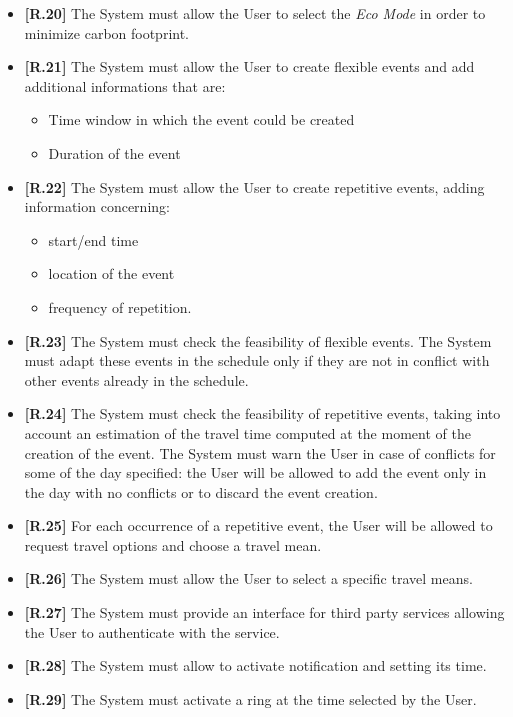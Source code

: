 \begin{itemize}
	\item \textbf{[R.20]} The System must allow the User to select the \textit{Eco Mode} in order to minimize carbon footprint.
	\item \textbf{[R.21]} The System must allow the User to create flexible events and add additional informations that are:
	\begin{itemize}
		\item Time window in which the event could be created
		\item Duration of the event
	\end{itemize}
	\item \textbf{[R.22]} The System must allow the User to create repetitive events, adding information concerning:
	\begin{itemize}
		\item start/end time
		\item location of the event
		\item frequency of repetition.
	\end{itemize}
	\item \textbf{[R.23]} The System must check the feasibility of flexible events. The System must adapt these events in the schedule only if they are not in conflict with other events already in the schedule. 
	\item \textbf{[R.24]} The System must check the feasibility of repetitive events, taking into account an estimation of the travel time computed at the moment of the creation of the event.
	The System must warn the User in case of conflicts for some of the day specified: the User will be allowed to add the event only in the day with no conflicts or to discard the event creation.
	\item \textbf{[R.25]} For each occurrence of a repetitive event, the User will be allowed to request travel options and choose a travel mean.
	\item \textbf{[R.26]} The System must allow the User to select a specific travel means.
	\item \textbf{[R.27]} The System must provide an interface for third party services allowing the User to authenticate with the service.
	\item \textbf{[R.28]} The System must allow to activate notification and setting its time.
	\item \textbf{[R.29]} The System must activate a ring at the time selected by the User.
\end{itemize}

